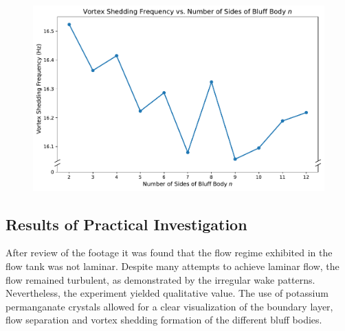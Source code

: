 \begin{figure}[H]
	\centering
	\includegraphics[width=\textwidth]{images/overall}
	\caption{}
	\label{fig:overall} 
\end{figure}


\subsection{Results of Practical Investigation}
After review of the footage it was found that the flow regime exhibited in the flow tank was not laminar. Despite many attempts to achieve laminar flow, the flow remained turbulent, as demonstrated by the irregular wake patterns. Nevertheless, the experiment yielded qualitative value. The use of potassium permanganate crystals allowed for a clear visualization of the boundary layer, flow separation and vortex shedding formation of the different bluff bodies.





